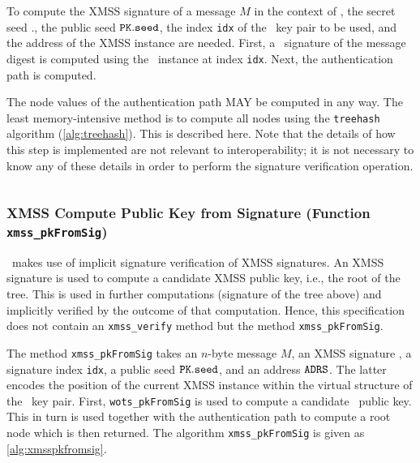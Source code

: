 To compute the XMSS signature of a message $M$ in the context of \SPHINCSA, the secret seed \sk.\seed, the public seed $\pk.\seed$, the index \texttt{idx} of the \WOTSCS\ key pair to be used, and the address \ADRS of the XMSS instance are needed. First, a \WOTSCS\ signature of the message digest is computed using the \WOTSCS\ instance at index \texttt{idx}. Next, the authentication path is computed.

The node values of the authentication path MAY be computed in any way. The least memory-intensive method is to compute all nodes using the \texttt{treehash} algorithm (\cref{alg:treehash}). This is described here. Note that the details of how this step is implemented are not relevant to interoperability; it is not necessary to know any of these details in order to perform the signature verification operation.

\begin{algorithm}
\inputminted[breaklines,linenos,tabsize=2,mathescape,escapeinside=||]{C}{paper/code/xmss_sign.cs}
\caption{\texttt{xmss\_sign} --- Generating an XMSS signature.}
\label{alg:xmsssign}
\end{algorithm}

\subsubsection{XMSS Compute Public Key from Signature (Function \texttt{xmss\_pkFromSig})}

\SPHINCSA\ makes use of implicit signature verification of XMSS signatures. An XMSS signature is used to compute a candidate XMSS public key, i.e., the root of the tree. This is used in further computations (signature of the tree above) and implicitly verified by the outcome of that computation. Hence, this specification does not contain an \texttt{xmss\_verify} method but the method \texttt{xmss\_pkFromSig}.

The method \texttt{xmss\_pkFromSig} takes an $n$-byte message $M$, an XMSS signature \sigxmss, a signature index \texttt{idx}, a public seed $\pk.\seed$, and an address $\mathtt{ADRS}$. The latter encodes the position of the current XMSS instance within the virtual structure of the \SPHINCSA\ key pair. First, \texttt{wots\_pkFromSig} is used to compute a candidate \WOTSCS\ public key. This in turn is used together with the authentication path to compute a root node which is then returned. The algorithm \texttt{xmss\_pkFromSig} is given as \cref{alg:xmsspkfromsig}.

\begin{algorithm}
\inputminted[breaklines,linenos,tabsize=2,mathescape,escapeinside=||]{C}{paper/code/xmss_pkFromSig.cs}
\caption{\texttt{xmss\_pkFromSig} --- Computing an XMSS public key from an XMSS signature.}
\label{alg:xmsspkfromsig}
\end{algorithm}




